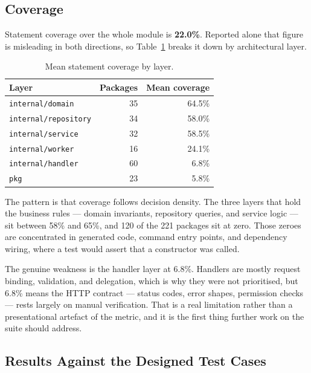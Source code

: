 \documentclass[a4paper]{article}
\begin{document}
\subsection{Coverage}

Statement coverage over the whole module is \textbf{22.0\%}. Reported alone
that figure is misleading in both directions, so Table~\ref{tab:coverage-layer}
breaks it down by architectural layer.

\begin{table}[H]
\centering
\caption{Mean statement coverage by layer.}
\label{tab:coverage-layer}
\small
\begin{tabular}{|p{4.6cm}|r|r|}
\hline
\textbf{Layer} & \textbf{Packages} & \textbf{Mean coverage} \\
\hline
\texttt{internal/domain} & 35 & 64.5\% \\
\hline
\texttt{internal/repository} & 34 & 58.0\% \\
\hline
\texttt{internal/service} & 32 & 58.5\% \\
\hline
\texttt{internal/worker} & 16 & 24.1\% \\
\hline
\texttt{internal/handler} & 60 & 6.8\% \\
\hline
\texttt{pkg} & 23 & 5.8\% \\
\hline
\end{tabular}
\end{table}

The pattern is that coverage follows decision density. The three layers that
hold the business rules --- domain invariants, repository queries, and service
logic --- sit between 58\% and 65\%, and 120 of the 221 packages sit at zero.
Those zeroes are concentrated in generated code, command entry points, and
dependency wiring, where a test would assert that a constructor was called.

The genuine weakness is the handler layer at 6.8\%. Handlers are mostly request
binding, validation, and delegation, which is why they were not prioritised,
but 6.8\% means the HTTP contract --- status codes, error shapes, permission
checks --- rests largely on manual verification. That is a real limitation
rather than a presentational artefact of the metric, and it is the first thing
further work on the suite should address.

\subsection{Results Against the Designed Test Cases}
\label{sec:tc-results}
\end{document}
